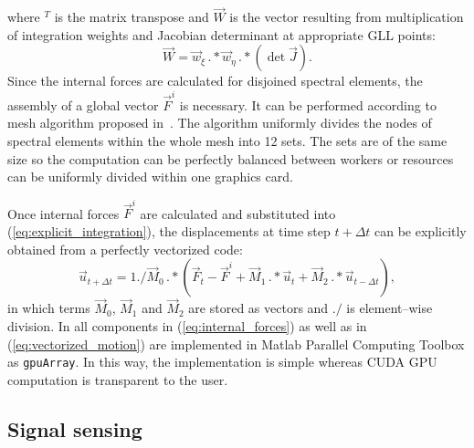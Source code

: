 where \(^T\) is the matrix transpose and \(\vec{W}\) is the vector resulting from  multiplication of integration weights and Jacobian determinant at appropriate GLL points:
\begin{equation}
\vec{W} = \vec{w}_{\xi}\,.*\vec{w}_{\eta}\,.*\left(\det\vec{J}\right).
\end{equation}
Since the internal forces are calculated for disjoined spectral elements, the assembly of a global vector \(\vec{F}^i\) is necessary. It can be performed according to mesh   algorithm proposed in~\cite{Kudela2016}. The algorithm uniformly divides the nodes of spectral elements within the whole mesh into 12 sets. The sets are of the same size so the computation can be perfectly balanced between workers or resources can be uniformly divided within one graphics card.

Once internal forces \(\vec{F}^i\) are calculated and substituted into (\ref{eq:explicit_integration}), the displacements at time step \(t+\Delta t\) can be explicitly obtained from a perfectly vectorized code:
\begin{equation}
\vec{u}_{t+\Delta t}=1./\vec{M}_0\, .*\left(\vec{F}_t - \vec{F}^i +\vec{M}_1 \, .* \vec{u}_t +\vec{M}_2 \, .* \vec{u}_{t-\Delta t}\right),\label{eq:vectorized_motion}
\end{equation}
in which terms \(\vec{M}_0\), \(\vec{M}_1\) and \(\vec{M}_2\) are stored as vectors and \(./\) is element--wise division. In   all components in (\ref{eq:internal_forces}) as well as in (\ref{eq:vectorized_motion}) are implemented in Matlab Parallel Computing Toolbox as \verb|gpuArray|. In this way, the implementation is simple whereas CUDA GPU computation is transparent to the user. 

\subsection{Signal sensing}

